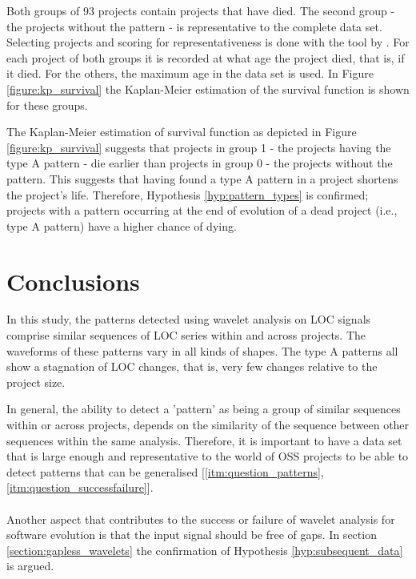 Both groups of 93 projects contain projects that have died. The second group -
the projects without the pattern - is representative to the complete data set.
Selecting projects and scoring for representativeness is done with the tool by
\citet{nagappan}. For each project of both groups it is recorded at what age the
project died, that is, if it died. For the others, the maximum age in the data
set is used. In Figure \ref{figure:kp_survival} the Kaplan-Meier estimation of
the survival function is shown for these groups.



\noindent
The Kaplan-Meier estimation of survival function as depicted in Figure
\ref{figure:kp_survival} suggests that projects in group 1 - the projects
having the type A pattern - die earlier than projects in group 0 - the projects
without the pattern. This suggests that having found a type A pattern in a
project shortens the project's life. Therefore, Hypothesis
\ref{hyp:pattern_types} is confirmed; projects with a pattern occurring at the
end of evolution of a dead project (i.e., type A pattern) have a higher chance
of dying.

\section{Conclusions}
In this study, the patterns detected using wavelet analysis on LOC signals
comprise similar sequences of LOC series within and across projects. The
waveforms of these patterns vary in all kinds of shapes. The type A patterns
all show a stagnation of LOC changes, that is, very few changes relative to the
project size.

In general, the ability to detect a 'pattern' as being a group of similar
sequences within or across projects, depends on the similarity of the sequence
between other sequences within the same analysis. Therefore, it is important to
have a data set that is large enough and representative to the world of OSS
projects to be able to detect patterns that can be generalised
[\ref{itm:question_patterns}, \ref{itm:question_successfailure}].

\paragraph{}
Another aspect that contributes to the success or failure of wavelet analysis
for software evolution is that the input signal should be free of gaps. In
section \ref{section:gapless_wavelets} the confirmation of Hypothesis
\ref{hyp:subsequent_data} is argued.

